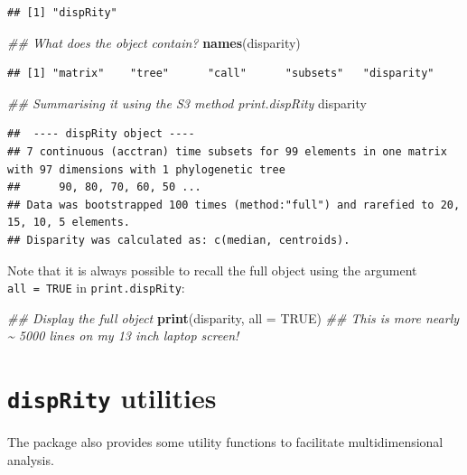 \documentclass[
]{book}
\newenvironment{Shaded}{\begin{snugshade}}{\end{snugshade}}
\newcommand{\CommentTok}[1]{\textcolor[rgb]{0.56,0.35,0.01}{\textit{#1}}}
\newcommand{\DataTypeTok}[1]{\textcolor[rgb]{0.13,0.29,0.53}{#1}}
\newcommand{\KeywordTok}[1]{\textcolor[rgb]{0.13,0.29,0.53}{\textbf{#1}}}
\newcommand{\NormalTok}[1]{#1}
\newcommand{\OtherTok}[1]{\textcolor[rgb]{0.56,0.35,0.01}{#1}}
\begin{document}
\begin{verbatim}
## [1] "dispRity"
\end{verbatim}

\begin{Shaded}
\begin{Highlighting}[]
\CommentTok{\#\# What does the object contain?}
\KeywordTok{names}\NormalTok{(disparity)}
\end{Highlighting}
\end{Shaded}

\begin{verbatim}
## [1] "matrix"    "tree"      "call"      "subsets"   "disparity"
\end{verbatim}

\begin{Shaded}
\begin{Highlighting}[]
\CommentTok{\#\# Summarising it using the S3 method print.dispRity}
\NormalTok{disparity}
\end{Highlighting}
\end{Shaded}

\begin{verbatim}
##  ---- dispRity object ---- 
## 7 continuous (acctran) time subsets for 99 elements in one matrix with 97 dimensions with 1 phylogenetic tree
##      90, 80, 70, 60, 50 ...
## Data was bootstrapped 100 times (method:"full") and rarefied to 20, 15, 10, 5 elements.
## Disparity was calculated as: c(median, centroids).
\end{verbatim}

Note that it is always possible to recall the full object using the argument \texttt{all\ =\ TRUE} in \texttt{print.dispRity}:

\begin{Shaded}
\begin{Highlighting}[]
\CommentTok{\#\# Display the full object}
\KeywordTok{print}\NormalTok{(disparity, }\DataTypeTok{all =} \OtherTok{TRUE}\NormalTok{)}
\CommentTok{\#\# This is more nearly \textasciitilde{} 5000 lines on my 13 inch laptop screen!}
\end{Highlighting}
\end{Shaded}

\hypertarget{utilities}{%
\section{\texorpdfstring{\texttt{dispRity} utilities}{dispRity utilities}}\label{utilities}}

The package also provides some utility functions to facilitate multidimensional analysis.
\end{document}
